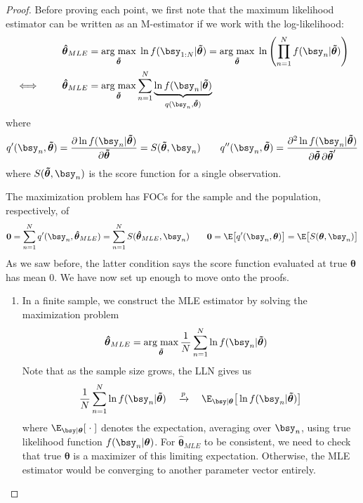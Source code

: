 \documentclass[12pt]{article}
\theoremstyle{plain}
\theoremstyle{definition}
\theoremstyle{remark}
\newcommand{\bstheta}{\boldsymbol{\theta}}
\newcommand{\bshattheta}{\boldsymbol{\hat{\theta}}}
\newcommand{\bstildetheta}{\boldsymbol{\tilde{\theta}}}
\renewcommand{\bso}{\boldsymbol{0}}
\DeclareMathOperator*{\argmax}{arg\;max}
\newcommand{\pto}{\xrightarrow{p}}
\newcommand{\sumnN}{\sum^N_{n=1}}
\newcommand{\prodnN}{\prod^N_{n=1}}
\begin{document}
\begin{proof}
Before proving each point, we first note that the maximum likelihood
estimator can be written as an M-estimator if we work with the
log-likelihood:
\begin{align*}
  \bshattheta_{MLE}
  &=
  \argmax_{\bstildetheta} \; \ln f(\bsy_{1:N}|\bstildetheta)
  =
  \argmax_{\bstildetheta} \;
  \ln\left(\prodnN f(\bsy_n|\bstildetheta)\right)
  \\
  \iff\qquad
  \bshattheta_{MLE}
  &=
  \argmax_{\bstildetheta}
  \sumnN
  \underbrace{%
  \ln f(\bsy_{n}|\bstildetheta)
  }_{q(\bsy_n,\bstildetheta)}
\end{align*}
where
\begin{align*}
  q'(\bsy_n,\bstildetheta)
  =
  \frac{\partial \ln f(\bsy_n|\bstildetheta)}{\partial \bstildetheta}
  = S(\bstildetheta,\bsy_n)
  \qquad
  q''(\bsy_n,\bstildetheta)
  =
  \frac{\partial^2 \ln f(\bsy_n|\bstildetheta)}{%
    \partial\bstildetheta\,\partial\bstildetheta'}
\end{align*}
where $S(\bstildetheta,\bsy_n)$ is the score function for a single
observation.

The maximization problem has FOCs for the sample and the population,
respectively, of
\begin{align*}
  \bso = \sumnN q'(\bsy_n,\bshattheta_{MLE})
  =
  \sumnN S(\bshattheta_{MLE},\bsy_n)
  \qquad
  \bso
  = \E\big[q'(\bsy_n,\bstheta)\big]
  = \E\big[S(\bstheta,\bsy_n)\big]
\end{align*}
As we saw before, the latter condition says the score function
evaluated at true $\bstheta$ has mean 0.
\clearpage
We have now set up enough to move onto the proofs.
\begin{enumerate}[label=(\roman*)]
  \item
    In a finite sample, we construct the MLE estimator by solving the
    maximization problem
    \begin{align*}
      \bshattheta_{MLE}
      &=
      \argmax_{\bstildetheta}
      \frac{1}{N}
      \sumnN \ln f(\bsy_{n}|\bstildetheta)
    \end{align*}
    Note that as the sample size grows, the LLN gives us
    \begin{align*}
      \frac{1}{N} \sumnN \ln f(\bsy_n|\bstildetheta)
      \quad\pto\quad
      \E_{\bsy|\bstheta}\big[\ln f(\bsy_n|\bstildetheta)\big]
    \end{align*}
    where $\E_{\bsy|\bstheta}[\;\cdot\;]$ denotes the expectation,
    averaging over $\bsy_n$, using true likelihood function
    $f(\bsy_n|\bstheta)$.
    For $\bshattheta_{MLE}$ to be consistent, we need to check that
    true $\bstheta$ is a maximizer of this limiting expectation.
    Otherwise, the MLE estimator would be converging to another
    parameter vector entirely.


\end{enumerate}
\end{proof}
\end{document}
